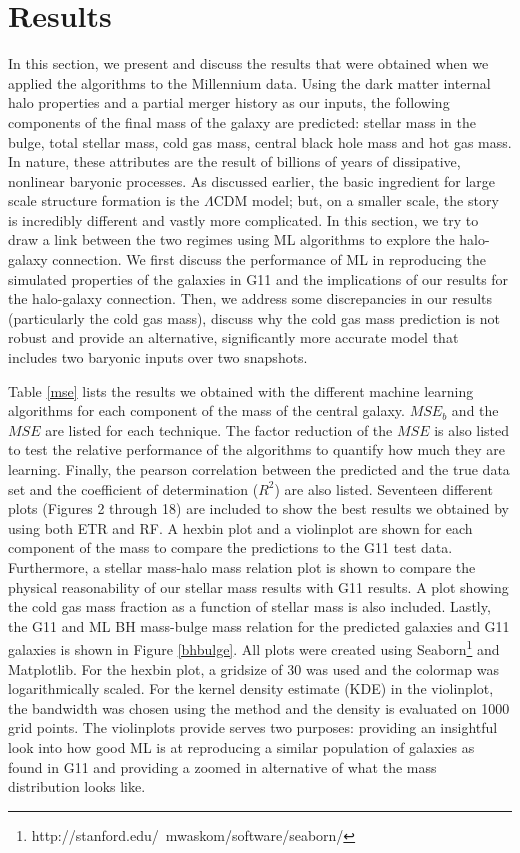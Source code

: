 \documentclass[a4paper,fleqn,usenatbib]{mnras}
\begin{document}
\section{Results} \label{results}
In this section, we present and discuss the results that were obtained when we applied the algorithms to the Millennium data. Using the dark matter internal halo properties and a partial merger history as our inputs, the following components of the final mass of the galaxy are predicted: stellar mass in the bulge, total stellar mass, cold gas mass, central black hole mass and hot gas mass. In nature, these attributes are the result of billions of years of dissipative, nonlinear baryonic processes. As discussed earlier, the basic ingredient for large scale structure formation is the $\Lambda$CDM model; but, on a smaller scale, the story is incredibly different and vastly more complicated. In this section, we try to draw a link between the two regimes using ML algorithms to explore the halo-galaxy connection. We first discuss the performance of ML in reproducing the simulated properties of the galaxies in G11 and the implications of our results for the halo-galaxy connection. Then, we address some discrepancies in our results (particularly the cold gas mass), discuss why the cold gas mass prediction is not robust and provide an alternative, significantly more accurate model that includes two baryonic inputs over two snapshots.


\par
Table \ref{mse} lists the results we obtained with the different machine learning algorithms for each component of the mass of the central galaxy. $MSE_b$ and the $MSE$ are listed for each technique. The factor reduction of the $MSE$ is also listed to test the relative performance of the algorithms to quantify how much they are learning. Finally, the pearson correlation between the predicted and the true data set and the coefficient of determination ($R^2$) are also listed. Seventeen different plots (Figures 2 through 18) are included to show the best results we obtained by using both ETR and RF. A hexbin plot and a violinplot are shown for each component of the mass to compare the predictions to the G11 test data. Furthermore, a stellar mass-halo mass relation plot is  shown to compare the physical reasonability of our stellar mass results with G11 results. A plot showing the cold gas mass fraction as a function of stellar mass is also included. Lastly, the G11 and ML BH mass-bulge mass relation for the predicted galaxies and G11 galaxies is shown in Figure \ref{bhbulge}. All plots were created using Seaborn\footnote{http://stanford.edu/~mwaskom/software/seaborn/} and Matplotlib. For the hexbin plot, a gridsize of 30 was used and the colormap was logarithmically scaled. For the kernel density estimate (KDE) in the violinplot, the bandwidth was chosen using the \citet{silverman1986density} method and the density is evaluated on 1000 grid points. The violinplots provide serves two purposes: providing an insightful look into how good ML is at reproducing a similar population of galaxies as found in G11 and providing a zoomed in alternative of what the mass distribution looks like. 
\end{document}

